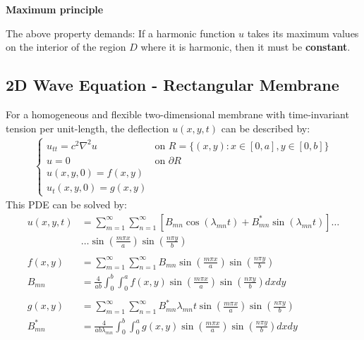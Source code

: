 \textbf{Maximum principle}

The above property demands: If a harmonic function $u$ takes its maximum values on the interior of the region $D$ where it is harmonic, then it must be \textbf{constant}.


\subsection{2D Wave Equation - Rectangular Membrane}\label{ssec:2d_wave_rect}
For a homogeneous and flexible two-dimensional membrane with time-invariant tension per unit-length,
the deflection $u(x,y,t)$ can be described by:
\begin{align*}
    \begin{cases}
        u_{tt}=c^2\nabla^2u & \text{on }R=\{(x,y):x\in[0,a],y\in[0,b]\} \\
        u=0                 & \text{on }\partial R                      \\
        u(x,y,0)=f(x,y)                                                 \\
        u_t(x,y,0)=g(x,y)
    \end{cases}
\end{align*}
This PDE can be solved by:
\begin{align*}
    u(x,y,t)   & =\sum_{m=1}^{\infty}\sum_{n=1}^{\infty}\left[B_{mn}\cos(\lambda_{mn}t)+B_{mn}^{*}\sin(\lambda_{mn}t)\right]\dots
    \\&\dots \sin\left(\frac{m\pi x}{a}\right)\sin\left(\frac{n\pi y}{b}\right)\\\\
    f(x,y)     & =\sum_{m=1}^{\infty}\sum_{n=1}^{\infty}B_{mn}\sin\left(\frac{m\pi x}a\right)\sin\left(\frac{n\pi y}b\right)             \\
    B_{mn}     & = \frac4{ab}\int_0^b\int_0^{a}f(x,y)\sin\left(\frac{m\pi x}a\right)\sin\left(\frac{n\pi y}b\right)dxdy                  \\\\
    g(x,y)     & =\sum_{m=1}^\infty\sum_{n=1}^\infty B_{mn}^*\lambda_{mn}t\sin\left(\frac{m\pi x}a\right)\sin\left(\frac{n\pi y}b\right) \\
    B_{mn}^{*} & =\frac4{ab\lambda_{mn}}\int_{0}^{b}\int_{0}^{a}g(x,y)\sin\left(\frac{m\pi x}a\right)\sin\left(\frac{n\pi y}b\right)dxdy
\end{align*}


